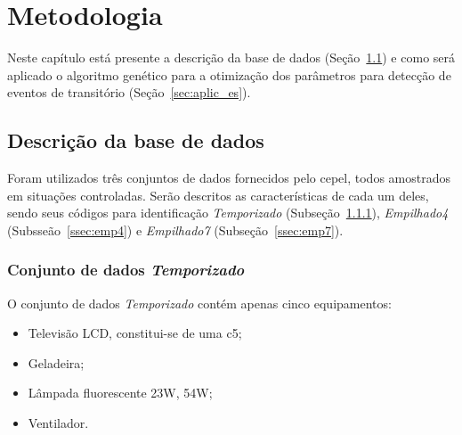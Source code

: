 \chapter{Metodologia}
\label{chap:metodologia}

Neste capítulo está presente a descrição da base de dados
(Seção~\ref{sec:base_de_dados}) e como será aplicado o algoritmo
genético para a otimização dos parâmetros para detecção de eventos de
transitório (Seção~\ref{sec:aplic_es}). 



\section{Descrição da base de dados}
\label{sec:base_de_dados}



Foram utilizados três conjuntos de dados fornecidos pelo \acs{cepel},
todos amostrados em situações controladas. Serão descritos as
características de cada um deles, sendo seus códigos para
identificação \emph{Temporizado} (Subseção~\ref{ssec:temp}),
\emph{Empilhado4} (Subsseão~\ref{ssec:emp4}) e \emph{Empilhado7}
(Subseção~\ref{ssec:emp7}).

\subsection{Conjunto de dados \emph{Temporizado}}
\label{ssec:temp}

\FloatBarrier
O conjunto de dados \emph{Temporizado} contém apenas cinco
equipamentos:

\begin{itemize}
\item Televisão LCD, constitui-se de uma \acs{c5};
\item Geladeira;
\item Lâmpada fluorescente 23W, 54W;
\item Ventilador.
\end{itemize}


